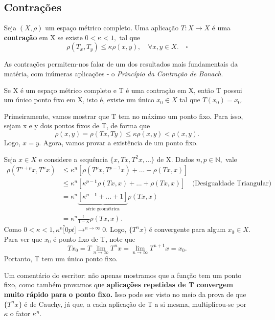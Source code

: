 \documentclass[metric_notes.tex]{subfiles}
\begin{document}
\subsection{Contrações}
\begin{def*}
	Seja \((X, \rho )\) um espaço métrico completo. Uma aplicação \(T:X\rightarrow X\) é uma \textbf{contração} em X se existe \(0 < \kappa < 1,\) tal que
	\[
		\rho (T_{x}, T_{y})\leq \kappa \rho (x, y),\quad \forall x, y\in X.\quad\square
	\]
\end{def*}
As contrações permitem-nos falar de um dos resultados mais fundamentais da matéria, com inúmeras aplicações - o \textit{Princípio da Contração de Banach}.
\hypertarget{banach_contraction}{\begin{theorem*}
		Se X é um espaço métrico completo e T é uma contração em X, então T possui um único ponto fixo em X, isto é, existe um único \(x_{0}\in X\) tal que \(T(x_{0}) = x_{0}.\)
	\end{theorem*}}
\begin{proof*}
	Primeiramente, vamos mostrar que T tem no máximo um ponto fixo. Para isso, sejam x e y dois pontos fixos de T, de forma que
	\[
		\rho (x, y) = \rho (Tx, Ty)\leq \kappa \rho (x, y) < \rho (x, y).
	\]
	Logo, \(x=y.\) Agora, vamos provar a existência de um ponto fixo.

	Seja \(x\in X\) e considere a sequência \(\{x, Tx, T^{2}x, \dotsc\}\) de X. Dados \(n, p\in \mathbb{N},\) vale
	\begin{align*}
		\rho (T^{n+p}x, T^{n}x) & \leq \kappa^{n}[\rho (T^{p}x, T^{p-1}x) + \dotsc + \rho (Tx, x)]                                       \\
		                        & \leq \kappa^{n}[\kappa^{p-1}\rho (Tx, x) + \dotsc + \rho(Tx, x)]\quad \text{(Desigualdade Triangular)} \\
		                        & = \kappa ^{n}\underbrace{[\kappa^{p-1} + \dotsc + 1]}_{\text{série geométrica}}\rho(Tx, x)             \\
		                        & = \kappa ^{n}\frac{1}{1-\kappa }\rho (Tx, x).
	\end{align*}
	Como \(0 < \kappa < 1, \kappa ^{n}\overbracket[0pt]{\longrightarrow}^{n\to \infty}0.\) Logo, \(\{T^{n}x\}\) é convergente para algum \(x_{0}\in X.\)
	Para ver que \(x_{0}\) é ponto fixo de T, note que
	\[
		Tx_{0} = T \lim_{n\to \infty}T^{n}x = \lim_{n\to \infty}T^{n+1}x = x_{0}.
	\]
	Portanto, T tem um único ponto fixo. \qedsymbol
\end{proof*}
Um comentário do escritor: não apenas mostramos que a função tem um ponto fixo, como também provamos que \textbf{aplicações repetidas de T convergem muito rápido para o ponto fixo.}
Isso pode ser visto no meio da prova de que \(\{T^{n}x\}\) é de Cauchy, já que, a cada aplicação de T a si mesma, multiplicou-se por \(\kappa \) o fator \(\kappa^{n}.\)
\end{document}
